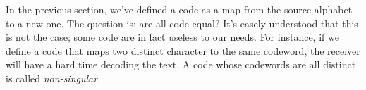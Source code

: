 \documentclass{subfiles}
\begin{document}
    In the previous section, we've defined a code as a map from the source alphabet 
        to a new one. The question is: are all code equal? 
        It's easely understood that this is not the case; 
        some code are in fact useless to our needs.
        For instance, if we define a code that maps two distinct character to the same 
        codeword, the receiver will have a hard time decoding the text.
        A code whose codewords are all distinct is called \emph{non-singular}. 
\end{document}
